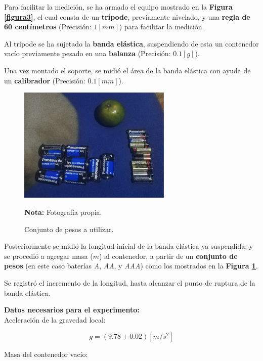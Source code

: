 \documentclass[letter,11pt]{article}
\newcommand{\source}[1]{\vspace{-11pt} \caption*{\small{\textbf{Nota:} {#1}}}}
\begin{document}
Para facilitar la medición, se ha armado el equipo mostrado en la
\textbf{Figura \ref{figura3}}, el cual consta de un \textbf{trípode},
previamente nivelado, y una \textbf{regla de 60 centímetros} (Precisión:
$1 [mm]$) para facilitar la medición.

Al trípode se ha sujetado la \textbf{banda elástica}, suspendiendo de esta un
contenedor vacío previamente pesado en una \textbf{balanza} (Precisión:
$0.1 [g]$).

Una vez montado el soporte, se midió el área de la banda elástica con ayuda de
un \textbf{calibrador} (Precisión: $0.1 [mm]$).

\begin{figure}
\centering
\includegraphics[width=0.65\textwidth]{resources/f2.eps}
\caption{Conjunto de pesos a utilizar.}
\label{figura2}
\source{Fotografía propia.}
\end{figure}

Posteriormente se midió la longitud inicial de la banda elástica ya suspendida;
y se procedió a agregar masa ($m$) al contenedor, a partir de un
\textbf{conjunto de pesos} (en este caso baterías \emph{A}, \emph{AA}, y
\emph{AAA}) como los mostrados en la \textbf{Figura \ref{figura2}}.

Se registró el incremento de la longitud, hasta alcanzar el punto de ruptura de
la banda elástica.

\vspace{0.35cm}
\textbf{Datos necesarios para el experimento:} \\

Aceleración de la gravedad local:

\begin{equation*}
    g = (9.78 \pm 0.02)[m/s^2]
\end{equation*}
\vspace{0.10cm}

Masa del contenedor vacío:
\end{document}
